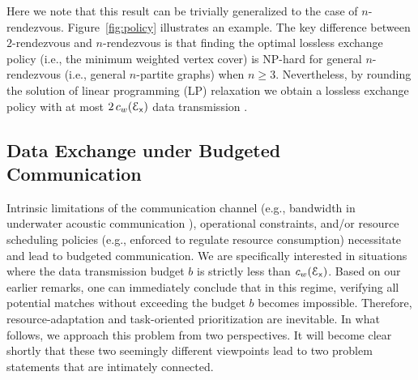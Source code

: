 \documentclass[conference]{IEEEtran}
\begin{document}
Here we note that this result can be trivially generalized to the case of
$n$-rendezvous.
Figure~\ref{fig:policy} illustrates an example.
The key difference between $2$-rendezvous and $n$-rendezvous is that finding
the optimal lossless exchange
policy (i.e., the minimum weighted vertex cover) is NP-hard for general
$n$-rendezvous (i.e., general $n$-partite graphs) when $n \geq 3$. Nevertheless,
by rounding the solution of linear programming (LP) relaxation we obtain a
lossless exchange policy with at most $2\, c_w(\mathcal{E}_\mathsf{x})$ data
transmission \cite{vazirani2013approximation}.



\subsection{Data Exchange under Budgeted Communication}
\label{subsec:two_perspectives}
Intrinsic limitations of the communication channel (e.g., bandwidth in
underwater acoustic communication \cite{paull2015communication}), operational constraints, and/or resource scheduling policies (e.g., enforced to
regulate resource consumption) necessitate and lead to budgeted communication.
We are specifically interested in situations where the data transmission budget
$b$ is strictly less than $c_w(\mathcal{E}_\mathsf{x})$. Based on our earlier remarks, one can
immediately conclude that in this regime, verifying all potential matches
without exceeding the budget $b$ becomes impossible. Therefore, resource-adaptation and
task-oriented prioritization are inevitable.
In what follows, we approach this 
problem from two perspectives. It will become clear shortly that these two
seemingly different viewpoints lead to two
problem statements that are intimately connected.

\vspace{0.2cm}
\end{document}
